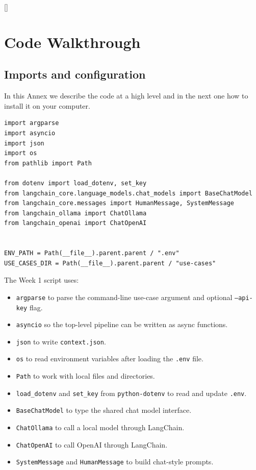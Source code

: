 \documentclass[12pt, a4paper]{article}
\begin{document}
\clearpage

\appendix
\renewcommand{\thesection}{\Alph{section}}
\titleformat{\section}{\Large\bfseries\color{darktext}}{Annex \thesection\ --\ }{0em}{}[\color{primary}\titlerule]

\section{Code Walkthrough}

\subsection{Imports and configuration}

In this Annex we describe the code at a high level and in the next one how to install it on your computer.

\begin{lstlisting}[style=pythonstyle]
import argparse
import asyncio
import json
import os
from pathlib import Path

from dotenv import load_dotenv, set_key
from langchain_core.language_models.chat_models import BaseChatModel
from langchain_core.messages import HumanMessage, SystemMessage
from langchain_ollama import ChatOllama
from langchain_openai import ChatOpenAI


ENV_PATH = Path(__file__).parent.parent / ".env"
USE_CASES_DIR = Path(__file__).parent.parent / "use-cases"
\end{lstlisting}

The Week 1 script uses:

\begin{itemize}[leftmargin=1.5em]
  \item \texttt{argparse} to parse the command-line use-case argument and optional \texttt{--api-key} flag.
  \item \texttt{asyncio} so the top-level pipeline can be written as async functions.
  \item \texttt{json} to write \texttt{context.json}.
  \item \texttt{os} to read environment variables after loading the \texttt{.env} file.
  \item \texttt{Path} to work with local files and directories.
  \item \texttt{load\_dotenv} and \texttt{set\_key} from \texttt{python-dotenv} to read and update \texttt{.env}.
  \item \texttt{BaseChatModel} to type the shared chat model interface.
  \item \texttt{ChatOllama} to call a local model through LangChain.
  \item \texttt{ChatOpenAI} to call OpenAI through LangChain.
  \item \texttt{SystemMessage} and \texttt{HumanMessage} to build chat-style prompts.
\end{itemize}
\end{document}
